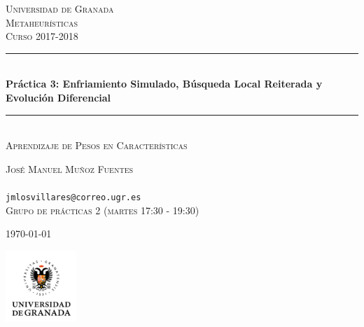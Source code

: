 \documentclass{article}
\begin{document}
\begin{titlepage} %
	\newcommand{\HRule}{\rule{\linewidth}{0.5mm}} %
	
	\center %
	
	
	\textsc{\LARGE Universidad de Granada}\\[1.5cm] %
	
	\textsc{Metaheurísticas}\\[0.3cm] %
	
	\textsc{Curso 2017-2018}\\[0.5cm] %
	
	
	\HRule\\[0.4cm]
	{\huge\bfseries Práctica 3: Enfriamiento Simulado, Búsqueda Local Reiterada y Evolución Diferencial}\\[0.4cm] %
	
	\HRule\\[1.5cm]
	
	\textsc{Aprendizaje de Pesos en Características}\\[0.5cm]
	
	\vfill

	\textsc{José Manuel Muñoz Fuentes}\\
	\\
	\texttt{jmlosvillares@correo.ugr.es}\\
	{\footnotesize\textsc{Grupo de prácticas 2 (martes 17:30 - 19:30)}}

	\vfill\vfill\vfill %
	
	{\large\today} %

	\vfill\vfill
	\includegraphics[width=0.2\textwidth]{ugr.png}\\[1cm] %
	
	
	\vfill %
	
\end{titlepage}
\tableofcontents
\end{document}

